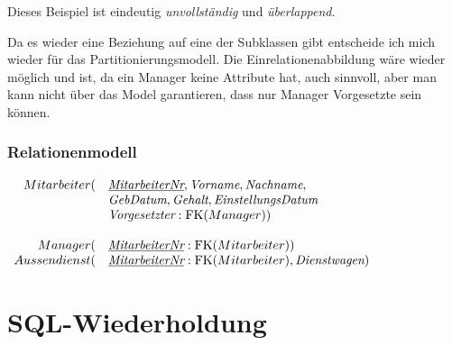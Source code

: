 \documentclass[12pt]{scrartcl}
\newcommand{\var}{\textit}
\newcommand{\PK}[1]{\underline{\var{#1}}}
\newcommand{\FK}[1]{\textup{FK}(#1)}
\newenvironment{relationalmodel}
  {\par\medskip
   \setlength{\arraycolsep}{0pt}%
   $\begin{array}{ r l }}
   {\end{array}$
   \par\medskip}
\begin{document}
Dieses Beispiel ist eindeutig \emph{unvollständig} und \emph{überlappend}.\par

Da es wieder eine Beziehung auf eine der Subklassen gibt entscheide ich mich wieder für das Partitionierungsmodell.
Die Einrelationenabbildung wäre wieder möglich und ist, da ein Manager keine Attribute hat, auch sinnvoll, aber man kann nicht über das Model garantieren, dass nur Manager Vorgesetzte sein können.\par

\subsubsection{Relationenmodell}

\begin{relationalmodel}
	Mitarbeiter( &
	\PK{MitarbeiterNr}, \var{Vorname}, \var{Nachname}, \\
	& \var{GebDatum}, \var{Gehalt}, \var{EinstellungsDatum} \\
	& \var{Vorgesetzter} : \FK{Manager}) \\ \\
	Manager( &
	\PK{MitarbeiterNr} : \FK{Mitarbeiter}) \\
	Aussendienst( &
	\PK{MitarbeiterNr} : \FK{Mitarbeiter}, \var{Dienstwagen}) \\
\end{relationalmodel}

\section{SQL-Wiederholdung}
\end{document}
